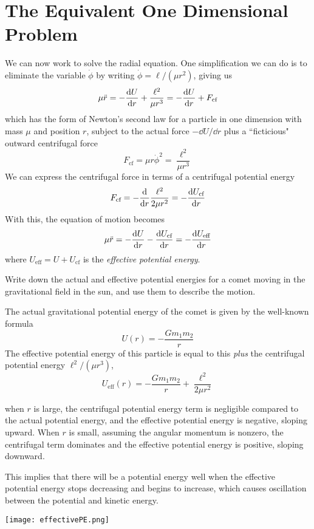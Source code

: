 \section{The Equivalent One Dimensional Problem}
We can now work to solve the radial equation. One simplification we can do is to eliminate the variable $\dot\phi$ by writing $\dot\phi = \ell/(\mu r^2)$, giving us
\[ \mu \ddot r = -\dv{U}{r} + \frac{\ell^2}{\mu r^3} = -\dv{U}{r} + F_\text{cf} \]
which has the form of Newton's second law for a particle in one dimension with mass $\mu$ and position $r$, subject to the actual force $-\dd U/\dd r$ plus a ``ficticious" outward centrifugal force
\[ F_\text{cf} = \mu r \dot\phi^2 = \frac{\ell^2}{\mu r^3} \]
We can express the centrifugal force in terms of a centrifugal potential energy
\[ F_\text{cf} = -\dv{r} \frac{\ell^2}{2\mu r^2} = -\dv{U_\text{cf}}{r} \]
With this, the equation of motion becomes
\[ \mu \ddot r = -\dv{U}{r} - \dv{U_\text{cf}}{r} = -\dv{U_\text{eff}}{r} \]
where $U_\text{eff} = U + U_\text{cf}$ is the \textit{effective potential energy}.
\begin{example}
    Write down the actual and effective potential energies for a comet moving in the gravitational field in the sun, and use them to describe the motion.

    The actual gravitational potential energy of the comet is given by the well-known formula
    \[ U(r) = -\frac{Gm_1m_2}{r}\]
    The effective potential energy of this particle is equal to this \textit{plus} the centrifugal potential energy $\ell^2/(\mu r^3)$,
    \[ U_\text{eff}(r) = -\frac{Gm_1m_2}{r} + \frac{\ell^2}{2\mu r^2} \]
     \begin{minipage}{0.48\textwidth}
    when $r$ is large, the centrifugal potential energy term is negligible compared to the actual potential energy, and the effective potential energy is negative, sloping upward. When $r$ is small, assuming the angular momentum is nonzero, the centrifugal term dominates and the effective potential energy is positive, sloping downward.

   This implies that there will be a potential energy well when the effective potential energy stops decreasing and begins to increase, which causes oscillation between the potential and kinetic energy.
    \end{minipage}
    \begin{minipage}{0.48\textwidth}
    \parbox{\textwidth}{
        \texttt{[image: effectivePE.png]}
    }
    \end{minipage}
\end{example}
